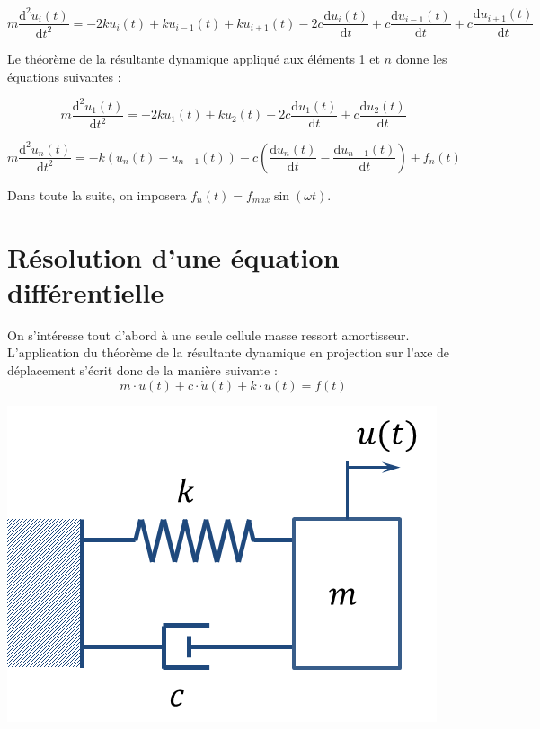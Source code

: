 \documentclass[10pt]{article}
\begin{document}
\begin{equation}
m\dfrac{\text{d}^2u_i(t)}{\text{d}t^2} = 
- 2 k u_i(t)  + k u_{i-1}(t) + k u_{i+1}(t)
- 2c \dfrac{\text{d}u_i(t)}{\text{d}t}   +c \dfrac{\text{d}u_{i-1}(t)}{\text{d}t} +c \dfrac{\text{d}u_{i+1}(t)}{\text{d}t}
\end{equation}

Le théorème de la résultante dynamique appliqué aux éléments 1 et $n$ donne les équations suivantes : 
%


\begin{equation}
m\dfrac{\text{d}^2u_1(t)}{\text{d}t^2} = 
- 2k u_1(t) + k u_2 (t) 
-2c \dfrac{\text{d}u_1(t)}{\text{d}t} 
+ c \dfrac{\text{d}u_2(t)}{\text{d}t} 
\end{equation}

\begin{equation}
m\dfrac{\text{d}^2u_n(t)}{\text{d}t^2} = 
-k\left(u_n(t)-u_{n-1}(t) \right)   - c\left(\dfrac{\text{d}u_{n}(t)}{\text{d}t}-\dfrac{\text{d}u_{n-1}(t)}{\text{d}t} \right) +f_n(t)
\end{equation}


Dans toute la suite, on imposera $f_n(t)=f_{max} \sin \left(\omega t\right)$.

\section{Résolution d'une équation différentielle}
\begin{minipage}[c]{.6\linewidth}
On s'intéresse tout d'abord à une seule cellule masse ressort amortisseur. L'application du théorème de la résultante dynamique en projection sur l'axe de déplacement s'écrit donc 
de la manière suivante : 
$$
m\cdot\ddot{u}(t)+c\cdot \dot{u}(t) + k\cdot u(t) = f(t)
$$
\end{minipage}\hfill
\begin{minipage}[c]{.37\linewidth}
\begin{center}
\includegraphics[width=.95\textwidth]{images/cellule}
\end{center}
\end{minipage}
\end{document}
